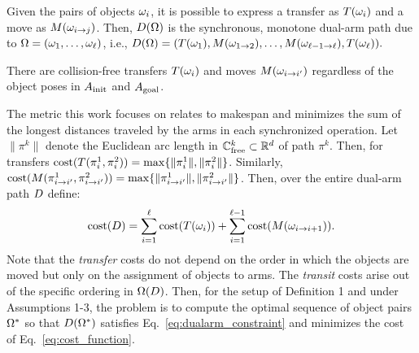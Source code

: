 {\noindent Given the pairs of objects ${\omega}_i$, it is possible to express a transfer as $T({\omega}_i)$ and a move as $M({\omega}_{i\rightarrow j})$.  Then, $D({{\Omega}})$ is the synchronous, monotone dual-arm path due to ${{\Omega}} = ({\omega}_1, \ldots, {\omega}_{\ell})$, i.e., $D({{\Omega}}) = (T({\omega}_1),M({\omega}_{1\rightarrow 2}),\ldots,M({\omega}_{\ell-1\rightarrow \ell}),T({\omega}_\ell)).$

{ There are collision-free transfers $T({\omega}_i)$ and moves $M({\omega}_{i\rightarrow i^{\prime}})$ regardless of the object poses in $A_{\rm init}$ and $A_{\rm goal}$.}

The metric this work focuses on relates to makespan and minimizes the sum of the longest distances traveled by the arms in each synchronized operation. Let $ \| \pi^k \| $ denote the Euclidean arc length in $\mathbb{C}_{{\rm free}}^k  \subset \mathbb{R}^d$ of path $ \pi^k $. Then, for transfers $\textup{cost}( T(\pi^1_i,\pi^2_i) ) = \max\{ \|\pi^1_i\|, \|\pi^2_i\| \}$. Similarly, $\textup{cost}( M(\pi^1_{i\rightarrow i^{\prime}},\pi^2_{i\rightarrow i^{\prime}}) ) = \max\{ \|\pi^1_{i\rightarrow i'}\|, \|\pi^2_{i\rightarrow i'}\| \}$. Then, over the entire dual-arm path $ D $ define:
\begin{equation}
\cost(\D) 
= \sum_{i=1}^{\ell}   \cost(T(\coma_i))   + \sum_{i=1}^{\ell-1}   \cost(M(\coma_{i\rightarrow i+1})). 
\label{eq:cost_function}
\end{equation}
Note that the \textit{transfer} costs do not depend on the order in which the objects are moved but only on the assignment of objects to arms. The \textit{transit} costs arise out of the specific ordering in $ {{\Omega}}(D)$. 
Then, for the setup of Definition 1 and under Assumptions 1-3, the problem is to compute the optimal sequence of object pairs ${{\Omega}}^*$ so that $D({{\Omega}}^*)$ satisfies Eq.~\ref{eq:dualarm_constraint} and minimizes the cost of Eq.~\ref{eq:cost_function}.

}
